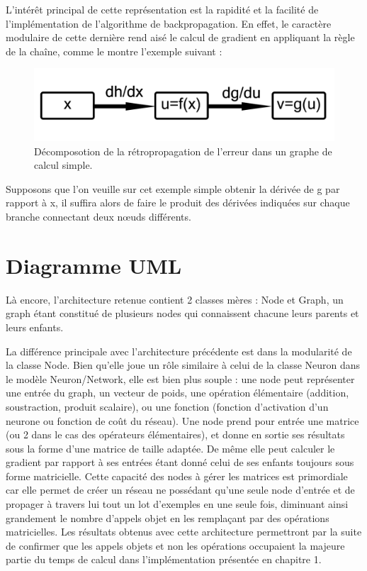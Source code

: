 \documentclass{report}
\begin{document}
L’intérêt principal de cette représentation est la rapidité et la facilité de l’implémentation de l’algorithme de backpropagation. En effet, le caractère modulaire de cette dernière rend aisé le calcul de gradient en appliquant la règle de la chaîne, comme le montre l’exemple suivant :

\begin{figure}[!h]
\begin{center}
\includegraphics[scale=0.25]{images/retropropagation_graphe.png}
\caption{Décomposotion de la rétropropagation de l'erreur dans un graphe de calcul simple.}
\label{retropropagation_graphe}
\end{center}
\end{figure}

Supposons que l’on veuille sur cet exemple simple obtenir la dérivée de g par rapport à x, il suffira alors de faire le produit des dérivées indiquées sur chaque branche connectant deux nœuds différents.

\section{Diagramme UML}

Là encore, l'architecture retenue contient 2 classes mères : Node et Graph, un graph étant constitué de plusieurs nodes qui connaissent chacune leurs parents et leurs enfants.

La différence principale avec l'architecture précédente est dans la modularité de la classe Node. Bien qu'elle joue un rôle similaire à celui de la classe Neuron dans le modèle Neuron/Network, elle est bien plus souple : une node peut représenter une entrée du graph, un vecteur de poids, une opération élémentaire (addition, soustraction, produit scalaire), ou une fonction (fonction d'activation d'un neurone ou fonction de coût du réseau). Une node prend pour entrée une matrice (ou 2 dans le cas des opérateurs élémentaires), et donne en sortie ses résultats sous la forme d'une matrice de taille adaptée. De même elle peut calculer le gradient par rapport à ses entrées étant donné celui de ses enfants toujours sous forme matricielle.  Cette capacité des nodes à gérer les matrices est primordiale car elle permet de créer un réseau ne possédant qu'une seule node d'entrée et de propager à travers lui tout un lot d'exemples en une seule fois, diminuant ainsi grandement le nombre d'appels objet en les remplaçant par des opérations matricielles. Les résultats obtenus avec cette architecture permettront par la suite de confirmer que les appels objets et non les opérations occupaient la majeure partie du temps de calcul dans l'implémentation présentée en chapitre 1.
\end{document}
